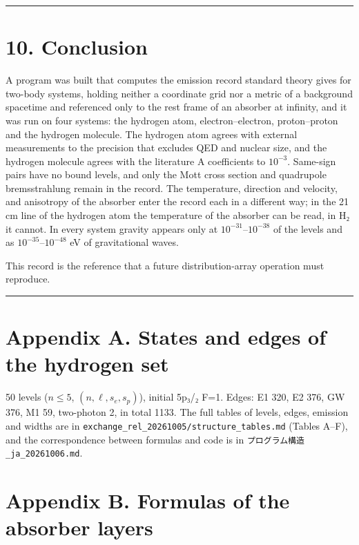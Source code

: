 \documentclass[
  a4paper,
]{article}
\begin{document}
\begin{center}\rule{0.5\linewidth}{0.5pt}\end{center}

\section{10. Conclusion}\label{conclusion}

A program was built that computes the emission record standard theory
gives for two-body systems, holding neither a coordinate grid nor a
metric of a background spacetime and referenced only to the rest frame
of an absorber at infinity, and it was run on four systems: the hydrogen
atom, electron--electron, proton--proton and the hydrogen molecule. The
hydrogen atom agrees with external measurements to the precision that
excludes QED and nuclear size, and the hydrogen molecule agrees with the
literature A coefficients to \(10^{-3}\). Same-sign pairs have no bound
levels, and only the Mott cross section and quadrupole bremsstrahlung
remain in the record. The temperature, direction and velocity, and
anisotropy of the absorber enter the record each in a different way; in
the 21 cm line of the hydrogen atom the temperature of the absorber can
be read, in H₂ it cannot. In every system gravity appears only at
\(10^{-31}\)--\(10^{-38}\) of the levels and as
\(10^{-35}\)--\(10^{-48}\) eV of gravitational waves.

This record is the reference that a future distribution-array operation
must reproduce.

\begin{center}\rule{0.5\linewidth}{0.5pt}\end{center}

\section{Appendix A. States and edges of the hydrogen
set}\label{appendix-a.-states-and-edges-of-the-hydrogen-set}

50 levels (\(n\le5\), \((n,\ell,s_e,s_p)\)), initial 5p₃/₂ F=1. Edges:
E1 320, E2 376, GW 376, M1 59, two-photon 2, in total 1133. The full
tables of levels, edges, emission and widths are in
\texttt{exchange\_rel\_20261005/structure\_tables.md} (Tables A--F), and
the correspondence between formulas and code is in
\texttt{プログラム構造\_ja\_20261006.md}.

\section{Appendix B. Formulas of the absorber
layers}\label{appendix-b.-formulas-of-the-absorber-layers}
\end{document}
